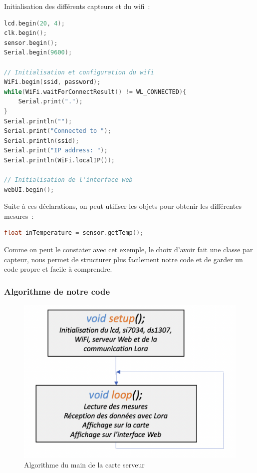         \vspace{.5 cm}

        \noindent
        Initialisation des différents capteurs et du wifi~: 


\begin{lstlisting}[style=myC, caption=Initialisation, language=C, frame=lines]
lcd.begin(20, 4);
clk.begin();
sensor.begin();
Serial.begin(9600);

// Initialisation et configuration du wifi
WiFi.begin(ssid, password);
while(WiFi.waitForConnectResult() != WL_CONNECTED){      
    Serial.print(".");
}
Serial.println("");
Serial.print("Connected to ");
Serial.println(ssid);
Serial.print("IP address: ");
Serial.println(WiFi.localIP());  

// Initialisation de l'interface web
webUI.begin();
\end{lstlisting}

        \vspace{.5 cm}

        \noindent
        Suite à ces déclarations, on peut utiliser les objets pour obtenir les différentes mesures~: 

\begin{lstlisting}[style=myC, caption=Lecture de température sur le SHT21, language=C, frame=lines]
float inTemperature = sensor.getTemp();
\end{lstlisting}

        \vspace{.5 cm}
        Comme on peut le constater avec cet exemple, le choix d'avoir fait une classe par capteur, nous permet de structurer plus facilement notre code et de garder un code propre et facile à comprendre.\\

        \vspace{.5 cm}

        \noindent
        \subsubsection{Algorithme de notre code}
        \vspace{.2 cm}

            \begin{figure}[!h]
                \begin{center}
                    \includegraphics[width=.5\textwidth]{img/code/algo_main_server.png}
                    \caption{\label{fig:algo_main_server}Algorithme du main de la carte serveur}  
                \end{center}
            \end{figure}
